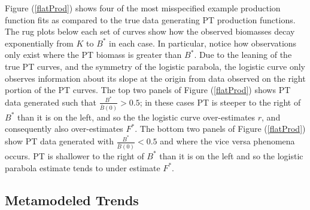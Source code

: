 %
Figure (\ref{flatProd}) shows four of the most misspecified example
production function fits as compared to the true data generating PT production
functions. The rug plots below each set of curves show how the observed
biomasses decay exponentially from $K$ to $B^*$ in each case. In particular,
notice how observations only exist where the PT biomass is greater than $B^*$.
Due to the leaning of the true PT curves, and the symmetry of the logistic
parabola, the logistic curve only observes information about its slope at the
origin from data observed on the right portion of the PT curves. The top two
panels of Figure (\ref{flatProd}) shows PT data generated such
that $\frac{B^*}{\bar B(0)}>0.5$; in these cases PT is steeper to the right of
$B^*$ than it is on the left, and so the the logistic curve over-estimates $r$,
and consequently also over-estimates $F^*$. %
The bottom two panels of Figure (\ref{flatProd}) show PT data
generated with $\frac{B^*}{\bar B(0)}<0.5$ and where the vice versa phenomena
occurs. PT is shallower to the right of $B^*$ than it is on the left and so the
logistic parabola estimate tends to under estimate $F^*$.

%
\subsection{Metamodeled Trends}



